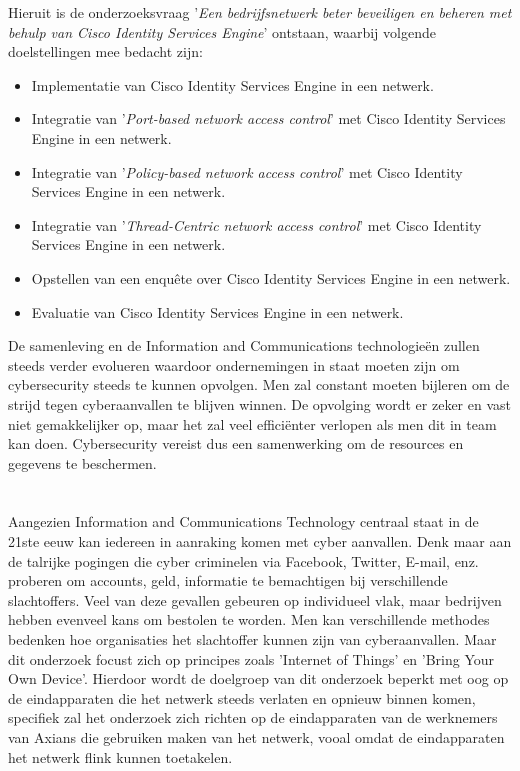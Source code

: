 \newline
\newline
Hieruit is de onderzoeksvraag '\textit{Een bedrijfsnetwerk beter beveiligen en beheren met behulp van Cisco Identity Services Engine}' ontstaan, waarbij volgende doelstellingen mee bedacht zijn: 

\begin{itemize}
	\item Implementatie van Cisco Identity Services Engine in een netwerk.
	\item Integratie van '\textit{Port-based network access control}' met Cisco Identity Services Engine in een netwerk.
	\item Integratie van '\textit{Policy-based network access control}' met Cisco Identity Services Engine in een netwerk.
	\item Integratie van '\textit{Thread-Centric network access control}' met Cisco Identity Services Engine in een netwerk.
	\item Opstellen van een enquête over Cisco Identity Services Engine in een netwerk.
	\item Evaluatie van Cisco Identity Services Engine in een netwerk.
\end{itemize}

De samenleving en de Information and Communications technologieën zullen steeds verder evolueren waardoor ondernemingen in staat moeten zijn om cybersecurity steeds te kunnen opvolgen. Men zal constant moeten bijleren om de strijd tegen cyberaanvallen te blijven winnen. De opvolging wordt er zeker en vast niet gemakkelijker op, maar het zal veel efficiënter verlopen als men dit in team kan doen. Cybersecurity vereist dus een samenwerking om de resources en gegevens te beschermen.

\section{}
\label{sec:probleemstelling}
Aangezien Information and Communications Technology centraal staat in de 21ste eeuw kan iedereen in aanraking komen met cyber aanvallen. Denk maar aan de talrijke pogingen die cyber criminelen via Facebook, Twitter, E-mail, enz. proberen om accounts, geld, informatie te bemachtigen bij verschillende slachtoffers. Veel van deze gevallen gebeuren op individueel vlak, maar bedrijven hebben evenveel kans om bestolen te worden. Men kan verschillende methodes bedenken hoe organisaties het slachtoffer kunnen zijn van cyberaanvallen. Maar dit onderzoek focust zich op principes zoals 'Internet of Things' en 'Bring Your Own Device'.
\newline
\newline
Hierdoor wordt de doelgroep van dit onderzoek beperkt met oog op de eindapparaten die het netwerk steeds verlaten en opnieuw binnen komen, specifiek zal het onderzoek zich richten op de eindapparaten van de werknemers van Axians die gebruiken maken van het netwerk, vooal omdat de eindapparaten het netwerk flink kunnen toetakelen.



